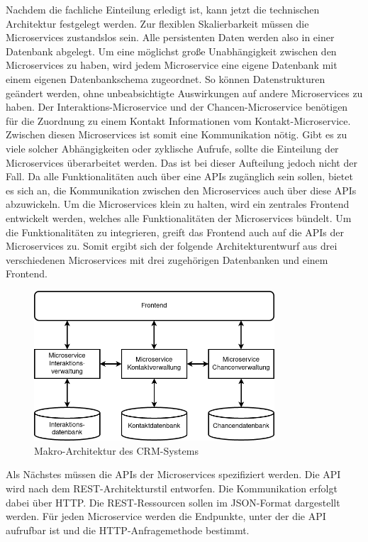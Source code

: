 Nachdem die fachliche Einteilung erledigt ist, kann jetzt die technischen Architektur festgelegt werden. Zur flexiblen Skalierbarkeit müssen die Microservices zustandslos sein. Alle persistenten Daten werden also in einer Datenbank abgelegt. Um eine möglichst große Unabhängigkeit zwischen den Microservices zu haben, wird jedem Microservice eine eigene Datenbank mit einem eigenen Datenbankschema zugeordnet. So können Datenstrukturen geändert werden, ohne unbeabsichtigte Auswirkungen auf andere Microservices zu haben. Der Interaktions-Microservice und der Chancen-Microservice benötigen für die Zuordnung zu einem Kontakt Informationen vom Kontakt-Microservice. Zwischen diesen Microservices ist somit eine Kommunikation nötig. Gibt es zu viele solcher Abhängigkeiten oder zyklische Aufrufe, sollte die Einteilung der Microservices überarbeitet werden. Das ist bei dieser Aufteilung jedoch nicht der Fall. Da alle Funktionalitäten auch über eine \acp{API} zugänglich sein sollen, bietet es sich an, die Kommunikation zwischen den Microservices auch über diese \acp{API} abzuwickeln. Um die Microservices klein zu halten, wird ein zentrales Frontend entwickelt werden, welches alle Funktionalitäten der Microservices bündelt. Um die Funktionalitäten zu integrieren, greift das Frontend auch auf die \acp{API} der Microservices zu. Somit ergibt sich der folgende Architekturentwurf aus drei verschiedenen Microservices mit drei zugehörigen Datenbanken und einem Frontend.

\begin{figure}[H] 
    \centering
    \includegraphics[width=0.8\textwidth]{figures/CRMEntwurf.png}
    \caption{Makro-Architektur des \ac{CRM}-Systems}
    \label{fig:CRMENTWURF}
\end{figure}

Als Nächstes müssen die \acp{API} der Microservices spezifiziert werden. Die \ac{API} wird nach dem \ac{REST}-Architekturstil entworfen. Die Kommunikation erfolgt dabei über \ac{HTTP}. Die \ac{REST}-Ressourcen sollen im \ac{JSON}-Format dargestellt werden. Für jeden Microservice werden die Endpunkte, unter der die API aufrufbar ist und die HTTP-Anfragemethode bestimmt.

